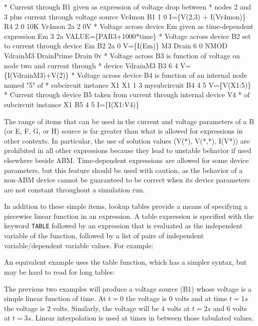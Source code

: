 \begin{vquote}
* Current through B1 given as expression of voltage drop between 
* nodes 2 and 3 plus current through voltage source Vr4mon
B1  1  0  I=\{V(2,3) + I(Vr4mon)\}
R4  2  0  10K
Vr4mon  2a 2  0V
* Voltage across device Em given as time-dependent expression 
Em  3  2a  VALUE=\{PAR3+1000*time\}
* Voltage across device B2 set to  current through device Em
B2  2a  0  V=\{I(Em)\}
M3  Drain  6  0  NMOD
VdrainM3 DrainPrime Drain 0v
* Voltage across B3 is function of voltage on node two and current through
* device VdrainM3
B3  6  4  V=\{I(VdrainM3)+V(2)\}
* Voltage across device B4 is function of an internal node named "5" of 
* subcircuit instance X1
X1 1 3 mysubcircuit
B4 4 5 V=\{V(X1:5)\}
* Current through device B5 taken from current through internal device V4
* of subcircuit instance X1
B5 4 5 I=\{I(X1:V4)\}
\end{vquote}

The range of items that can be used in the current and voltage
parameters of a B (or E, F, G, or H) source is far greater than what
is allowed for expressions in other contexts. In particular, the use
of solution values (V(*), V(*,*), I(V*)) are prohibited in all other
expressions because they lead to unstable behavior if used
elsewhere beside ABM. Time-dependent expressions are allowed for some device
parameters, but this feature should be used with caution, as the
behavior of a non-ABM device cannot be guaranteed to be correct when its 
device parameters are not constant throughout a simulation run.

In addition to these simple items, lookup tables provide a means of
specifying a piecewise linear function in an expression.  A table expression is
specified with the keyword \verb+TABLE+ followed by an expression that
is evaluated as the independent variable of the function, followed by a
list of pairs of independent variable/dependent variable values.  For
example:


An equivalent example uses the table function, which has a simpler syntax, but
 may be hard to read for long tables:


The previous two examples will produce a voltage source (B1) whose voltage
is a simple linear function of time.  At $t=0$ the voltage is $0$ volts and 
at time $t=1s$ the voltage is $2$ volts.  Similarly, the voltage will
be $4$ volts at $t=2s$ and $6$ volts at $t=3s$. Linear interpolation is
used at times in between those tabulated values.

